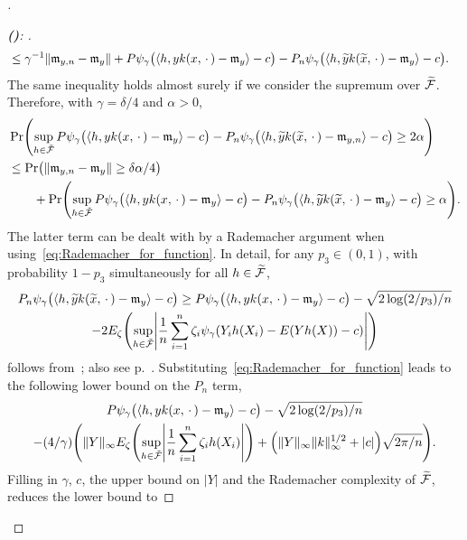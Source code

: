\documentclass[10pt]{amsart}
\theoremstyle{definition}\newtheorem{defi}[theo]{Definition}\newtheorem{rema}[theo]{Remark}\newtheorem{exam}[theo]{Example}\newtheorem{exem}[theo]{Example}\newtheorem{nota}[theo]{Notation}
\theoremstyle{remark}
\newcommand{\clF}{\mathcal{F}}
\newcommand{\mean}{\mathfrak{m}}
\let\oldtilde\tilde
\renewcommand*{\tilde}[1]{\mathchoice{\widetilde{#1}}{\widetilde{#1}}{\oldtilde{#1}}{\oldtilde{#1}}}
\let\originalleft\left
\let\originalright\right
\renewcommand{\left}{\mathopen{}\mathclose\bgroup\originalleft}
\renewcommand{\right}{\aftergroup\egroup\originalright}
\newcounter{setofstep}
\newcounter{step}[setofstep]
\newenvironment{step}[1][]{\refstepcounter{step}\begin{proof}[{\textbf{(\thestep)}\if#1\empty\else: #1\fi}]}{\let\qed\relax\end{proof}}
\renewcommand{\thestep}{\alph{step}}
\newenvironment{proofc}[1][\proofname]{\begin{proof}[{#1}]}{\end{proof}}\AtBeginDocument{\special{pdf:mapfile +yhmath.map}}
\begin{document}
\begin{proofc}
\begin{step}
\begin{align*}
&\leq \gamma^{-1} \|\mean_{y,n} - \mean_y\| + P \psi_\gamma\bigl(\langle h, y k(x,\,\cdot\,) - \mean_{y} \rangle - c\bigr) - P_n \psi_\gamma\bigl(\langle h, \tilde y k(\tilde x,\,\cdot\,) - \mean_{y} \rangle - c\bigr).
\end{align*}
The same inequality holds almost surely if we consider the supremum over $\tilde{\clF}$. Therefore, with $\gamma = \delta/4$ and $\alpha > 0$,
\begin{align*}
&\Pr\left(\sup_{h \in \tilde{\clF}} P \psi_\gamma\bigl(\langle h, y k(x,\,\cdot\,) - \mean_{y} \rangle - c\bigr)- P_n \psi_\gamma\bigl(\langle h, \tilde y k(\tilde x,\,\cdot\,) - \mean_{y,n} \rangle - c\bigr) \geq 2 \alpha\right) \\
&\leq \Pr\bigl(\|\mean_{y,n} - \mean_y\| \geq \delta \alpha /4\bigr) \\
& \qquad + \Pr\left(\sup_{h \in \tilde{\clF}} P \psi_\gamma\bigl(\langle h, y k(x,\,\cdot\,) - \mean_{y} \rangle - c\bigr)- P_n \psi_\gamma\bigl(\langle h, \tilde y k(\tilde x,\,\cdot\,) - \mean_{y} \rangle - c\bigr) \geq \alpha\right).
\end{align*}
The latter term can be dealt with by a Rademacher argument when using~\eqref{eq:Rademacher_for_function}. In detail, for any $p_3 \in (0,1)$, with probability $1-p_3$ simultaneously for all $h \in \tilde{\clF}$,
\begin{multline*}
P_n \psi_\gamma\bigl(\langle h, \tilde y k(\tilde x,\,\cdot\,) - \mean_{y} \rangle - c\bigr) \geq P \psi_\gamma\bigl(\langle h, y k(x,\,\cdot\,) - \mean_{y} \rangle - c\bigr) - \sqrt{2\log(2/p_3)/n} \\
- 2 E_\zeta \left(\sup_{h \in \tilde{\clF}} \left|\frac{1}{n} \sum_{i=1}^n \zeta_i \psi_\gamma(Y_i h(X_i) - E(Y h(X)) - c) \right| \right)
\end{multline*}
follows from~\cite[Theorem~3.4.5]{GINE15}; also see p.~\pageref{sec:Rademacher_expl}. Substituting~\eqref{eq:Rademacher_for_function} leads to the following lower bound on the $P_n$ term,
\begin{multline*}
P \psi_\gamma\bigl(\langle h, y k(x,\,\cdot\,) - \mean_{y} \rangle - c\bigr) - \sqrt{2\log(2/p_3)/n} \\
- (4/\gamma) \left(\|Y\|_\infty E_\zeta \left(\sup_{h \in \tilde{\clF}} \left|\frac{1}{n} \sum_{i=1}^n \zeta_i h(X_i) \right| \right) + \left(\|Y\|_\infty \|k\|_\infty^{1/2} + |c|\right) \sqrt{2\pi/ n}\right).
\end{multline*}
Filling in $\gamma$, $c$, the upper bound on $|Y|$ and the Rademacher complexity of $\tilde{\clF}$, reduces the lower bound to

\end{step}
\end{proofc}
\end{document}
